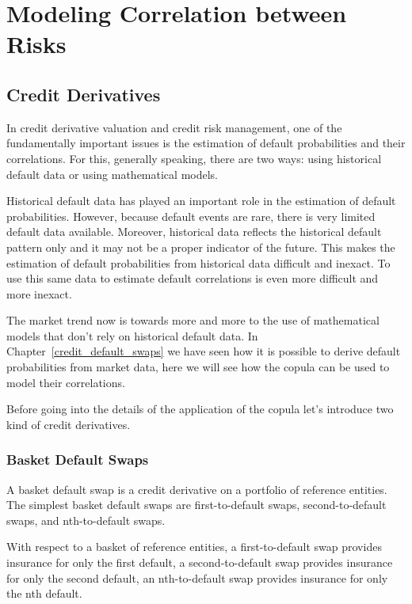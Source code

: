\chapter{Modeling Correlation between Risks}

\section{Credit Derivatives}\label{credit-derivatives}

In credit derivative valuation and credit risk management, one of the
fundamentally important issues is the estimation of default
probabilities and their correlations. For this, generally speaking,
there are two ways: using historical default data or using mathematical
models.

Historical default data has played an important role in the estimation
of default probabilities. However, because default events are rare,
there is very limited default data available. Moreover, historical data
reflects the historical default pattern only and it may not be a proper
indicator of the future. This makes the estimation of default
probabilities from historical data difficult and inexact. To use this
same data to estimate default correlations is even more difficult and
more inexact.

The market trend now is towards more and more to the use of mathematical
models that don't rely on historical default data. In
Chapter~\ref{credit_default_swaps} we have seen how it is possible to derive default probabilities from market data, here we will see how the copula can be used to model their correlations. 

Before going into the details of the application of the copula let's introduce two kind of credit derivatives.

\subsection{Basket Default Swaps}\label{basket-default-swaps}

A basket default swap is a credit derivative on a portfolio of reference
entities. The simplest basket default swaps are first-to-default swaps,
second-to-default swaps, and nth-to-default swaps. 

With respect to a basket of reference entities, a first-to-default swap provides insurance for only the first default, a second-to-default swap provides insurance
for only the second default, an nth-to-default swap provides insurance
for only the nth default. 

